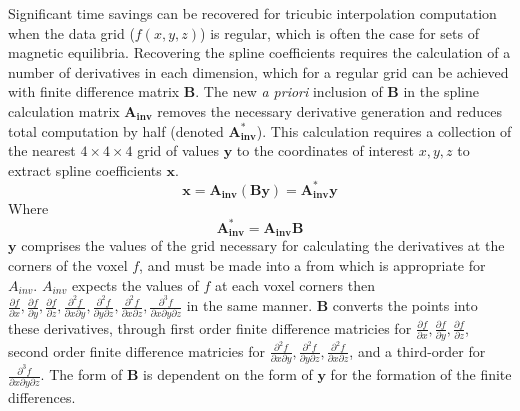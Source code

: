 \documentclass[12pt,floatfix,showpacs]{revtex4-1}
\begin{document}
Significant time savings can be recovered for tricubic interpolation computation when the data grid ($f(x,y,z)$) is regular, which is often the case for sets of magnetic equilibria. 
Recovering the spline coefficients requires the calculation of a number of derivatives in each dimension, which for a regular grid can be achieved with finite difference matrix $\boldsymbol{B}$. 
The new \emph{a priori} inclusion of $\boldsymbol{B}$ in the spline calculation matrix $\boldsymbol{A_{inv}}$ removes the necessary derivative generation and reduces total computation by half (denoted $\boldsymbol{A_{inv}^*}$). 
This calculation requires a collection of the nearest $4\times4\times4$ grid of values $\boldsymbol{y}$ to the coordinates of interest $x,y,z$ to extract spline coefficients $\boldsymbol{x}$.
\begin{equation}
\boldsymbol{x} = \boldsymbol{A_{inv}} ( \boldsymbol{B} \boldsymbol{y}) = \boldsymbol{A_{inv}^*}\boldsymbol{y}
\end{equation}
Where
\begin{equation}
\boldsymbol{A_{inv}^*} = \boldsymbol{A_{inv}}\boldsymbol{B} 
\end{equation}
 $\boldsymbol{y}$ comprises the values of the grid necessary for calculating the derivatives at the corners of the voxel $f$, and must be made into a from which is appropriate for $A_{inv}$. $A_{inv}$ expects the values of $f$ at each voxel corners then $\frac{\partial f}{\partial x}, \frac{\partial f}{\partial y}, \frac{\partial f}{\partial z}, \frac{\partial^2 f}{\partial x \partial y}, \frac{\partial^2 f}{\partial y \partial z}, \frac{\partial^2 f}{\partial x \partial z}, \frac{\partial^3 f}{\partial x \partial y \partial z}$ in the same manner. $\boldsymbol{B}$ converts the points into these derivatives, through first order finite difference matricies for $\frac{\partial f}{\partial x}, \frac{\partial f}{\partial y}, \frac{\partial f}{\partial z}$, second order finite difference matricies for $\frac{\partial^2 f}{\partial x \partial y}, \frac{\partial^2 f}{\partial y \partial z}, \frac{\partial^2 f}{\partial x \partial z}$, and a third-order for $\frac{\partial^3 f}{\partial x \partial y \partial z}$. The form of $\boldsymbol{B}$ is dependent on the form of $\boldsymbol{y}$ for the formation of the finite differences.




\end{document}
